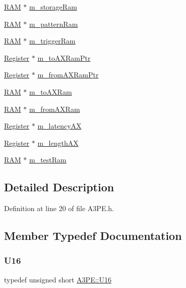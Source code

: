 \begin{DoxyCompactItemize}
\item 
\hyperlink{classRAM}{R\+AM} $\ast$ \hyperlink{classA3PE_a41e317474e0c6e63bad4648903279be9}{m\+\_\+storage\+Ram}
\item 
\hyperlink{classRAM}{R\+AM} $\ast$ \hyperlink{classA3PE_a84d5deabbbf2d513144dd6a00390182e}{m\+\_\+pattern\+Ram}
\item 
\hyperlink{classRAM}{R\+AM} $\ast$ \hyperlink{classA3PE_a2b40e3937f0aa008ec7073acc5029fcc}{m\+\_\+trigger\+Ram}
\item 
\hyperlink{classRegister}{Register} $\ast$ \hyperlink{classA3PE_aae1b8b2e96bba94535bd4de766bd7e65}{m\+\_\+to\+A\+X\+Ram\+Ptr}
\item 
\hyperlink{classRegister}{Register} $\ast$ \hyperlink{classA3PE_a27ae9467bc128e46dd80443245df096a}{m\+\_\+from\+A\+X\+Ram\+Ptr}
\item 
\hyperlink{classRAM}{R\+AM} $\ast$ \hyperlink{classA3PE_ae586a3d2fd21556e84e1af656e3430b5}{m\+\_\+to\+A\+X\+Ram}
\item 
\hyperlink{classRAM}{R\+AM} $\ast$ \hyperlink{classA3PE_a91d3dd3e87e2c948dd67cb82a63d3858}{m\+\_\+from\+A\+X\+Ram}
\item 
\hyperlink{classRegister}{Register} $\ast$ \hyperlink{classA3PE_a061472eb539bb6ac99f4fa11a760eeaf}{m\+\_\+latency\+AX}
\item 
\hyperlink{classRegister}{Register} $\ast$ \hyperlink{classA3PE_a87c93a38343873f2d52741deca4750ce}{m\+\_\+length\+AX}
\item 
\hyperlink{classRAM}{R\+AM} $\ast$ \hyperlink{classA3PE_ad788e41ef5c674ab1a7671f3db0ffef6}{m\+\_\+test\+Ram}
\end{DoxyCompactItemize}


\subsection{Detailed Description}


Definition at line 20 of file A3\+P\+E.\+h.



\subsection{Member Typedef Documentation}
\mbox{\label{classA3PE_a2ee28b2899c3cc4f22821b4138758c28}} 
\subsubsection{\texorpdfstring{U16}{U16}}
{\footnotesize\ttfamily typedef unsigned short \hyperlink{classA3PE_a2ee28b2899c3cc4f22821b4138758c28}{A3\+P\+E\+::\+U16}}



